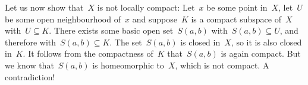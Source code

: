 Let us now show that~$X$ is not locally compact:
Let~$x$ be some point in~$X$, let~$U$ be some open neighbourhood of~$x$ and suppose~$K$ is a compact subspace of~$X$ with~$U ⊆ K$.
There exists some basic open set~$S(a, b)$ with~$S(a, b) ⊆ U$, and therefore with~$S(a, b) ⊆ K$.
The set~$S(a, b)$ is closed in~$X$, so it is also closed in~$K$.
It follows from the compactness of~$K$ that~$S(a, b)$ is again compact.
But we know that~$S(a, b)$ is homeomorphic to~$X$, which is not compact.
A contradiction!
